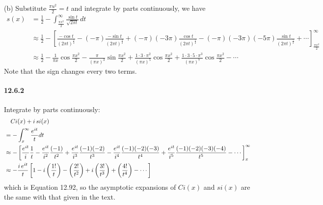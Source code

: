 \documentclass[a4paper]{article}
\begin{document}
(b)
Substitute $\frac{\pi u^2}{2}=t$ and integrate by parts continuously, we have
\begin{equation*}
    \begin{split}
        s(x) & =\frac{1}{2}-\int_{\frac{\pi x^2}{2}}^\infty\frac{\sin t}{\sqrt{2\pi t}}\,dt\\
        & \approx\frac{1}{2}-\left[\frac{-\cos t}{(2\pi t)^{\frac{1}{2}}}-(-\pi)\frac{-\sin t}{(2\pi t)^{\frac{3}{2}}}+(-\pi)(-3\pi)\frac{\cos t}{(2\pi t)^{\frac{5}{2}}}-(-\pi)(-3\pi)(-5\pi)\frac{\sin t}{(2\pi t)^{\frac{7}{2}}}+\cdots \right]_{\frac{\pi x^2}{2}}^\infty\\
        &  \approx\frac{1}{2}-\frac{1}{\pi x}\cos\frac{\pi x^2}{2}-\frac{\pi}{(\pi x)^3}\sin\frac{\pi x^2}{2}+\frac{1\cdot3\cdot\pi^2}{(\pi x)^5}\cos\frac{\pi x^2}{2}+\frac{1\cdot3\cdot5\cdot\pi^3}{(\pi x)^7}\cos\frac{\pi x^2}{2}-\cdots
    \end{split}
\end{equation*}
Note that the sign changes every two terms.

\paragraph{12.6.2}
Integrate by parts continuously:
\begin{equation*}
    \begin{split}
        & \quad Ci(x)+i\,si(x) \\ 
        & =-\int_x^\infty\frac{e^{it}}{t}dt\\
        & \approx -\left[\frac{e^{it}}{i}\frac{1}{t}-\frac{e^{it}}{i^2}\frac{(-1)}{t^2}+\frac{e^{it}}{i^3}\frac{(-1)(-2)}{t^3}-\frac{e^{it}}{i^4}\frac{(-1)(-2)(-3)}{t^4}+\frac{e^{it}}{i^5}\frac{(-1)(-2)(-3)(-4)}{t^5}-\cdots \right]_x^\infty\\
        & \approx -\frac{i\,e^{it}}{t}\left[1-i\left(\frac{1!}{t}\right)-\left(\frac{2!}{t^2}\right)+i\left(\frac{3!}{t^3}\right)+\left(\frac{4!}{t^4}\right)-\cdots \right]
    \end{split}
\end{equation*}
which is Equation 12.92, so the asymptotic expansions of $Ci(x)$ and $si(x)$ are the same with that given in the text.
\end{document}

